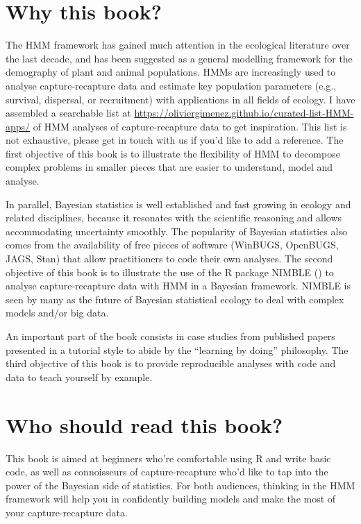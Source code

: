 \documentclass[
  12pt,
]{krantz}
\begin{document}
\section*{Why this book?}\label{why-this-book}


The HMM framework has gained much attention in the ecological literature over the last decade, and has been suggested as a general modelling framework for the demography of plant and animal populations. HMMs are increasingly used to analyse capture-recapture data and estimate key population parameters (e.g., survival, dispersal, or recruitment) with applications in all fields of ecology. I have assembled a searchable list at \url{https://oliviergimenez.github.io/curated-list-HMM-apps/} of HMM analyses of capture-recapture data to get inspiration. This list is not exhaustive, please get in touch with us if you'd like to add a reference. The first objective of this book is to illustrate the flexibility of HMM to decompose complex problems in smaller pieces that are easier to understand, model and analyse.

In parallel, Bayesian statistics is well established and fast growing in ecology and related disciplines, because it resonates with the scientific reasoning and allows accommodating uncertainty smoothly. The popularity of Bayesian statistics also comes from the availability of free pieces of software (WinBUGS, OpenBUGS, JAGS, Stan) that allow practitioners to code their own analyses. The second objective of this book is to illustrate the use of the R package NIMBLE (\citet{deValpine2017}) to analyse capture-recapture data with HMM in a Bayesian framework. NIMBLE is seen by many as the future of Bayesian statistical ecology to deal with complex models and/or big data.

An important part of the book consists in case studies from published papers presented in a tutorial style to abide by the ``learning by doing'' philosophy. The third objective of this book is to provide reproducible analyses with code and data to teach yourself by example.

\section*{Who should read this book?}\label{who-should-read-this-book}


This book is aimed at beginners who're comfortable using R and write basic code, as well as connoisseurs of capture-recapture who'd like to tap into the power of the Bayesian side of statistics. For both audiences, thinking in the HMM framework will help you in confidently building models and make the most of your capture-recapture data.
\end{document}
